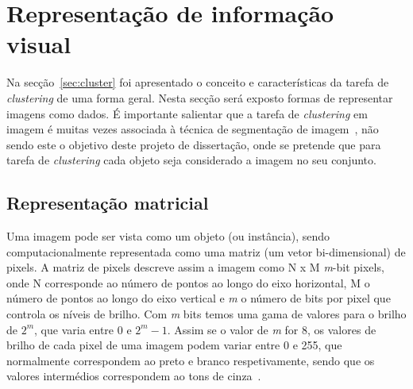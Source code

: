 \section{Representação de informação visual} \label{sec:represent}

Na secção~\ref{sec:cluster} foi apresentado o conceito e características da tarefa de \textit{clustering} de uma forma geral. Nesta secção será exposto formas de representar imagens como dados. É importante salientar que a tarefa de \textit{clustering} em imagem é muitas vezes associada à técnica de segmentação de imagem~\citet{Forsyth2011}, não sendo este o objetivo deste projeto de dissertação, onde se pretende que para tarefa de \textit{clustering} cada objeto seja considerado a imagem no seu conjunto. 

\subsection{Representação matricial} \label{subsec:matrix}

Uma imagem pode ser vista como um objeto (ou instância), sendo computacionalmente representada como uma matriz (um vetor bi-dimensional) de pixels. A matriz de pixels descreve assim a imagem como N x M \textit{m}-bit pixels, onde N corresponde ao número de pontos ao longo do eixo horizontal, M o número de pontos ao longo do eixo vertical e \textit{m} o número de bits por pixel que controla os níveis de brilho. Com \textit{m} bits temos uma gama de valores para o brilho de $ 2^m $, que varia entre 0 e $ 2^m - 1 $. Assim se o valor de \textit{m} for 8, os valores de brilho de cada pixel de uma imagem podem variar entre 0 e 255, que normalmente correspondem ao preto e branco respetivamente, sendo que os valores intermédios correspondem ao tons de cinza~\citet{Nixon2002}.

